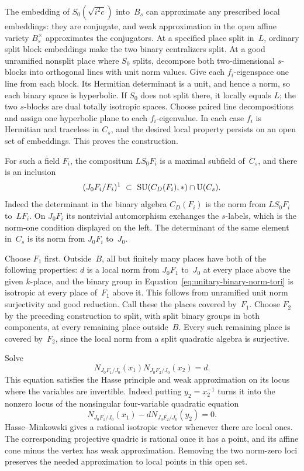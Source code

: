 The embedding of $S_0(\sqrt{i^2c})$ into~$B_s$ can approximate any
prescribed local embeddings: they are conjugate, and weak
approximation in the open affine variety $B_s^\times$ approximates
the conjugators.  At a specified place split in~$L$, ordinary split
block embeddings make the two binary centralizers split.  At a good
unramified nonsplit place where $S_0$ splits, decompose both
two-dimensional $s$-blocks into orthogonal lines with unit norm
values.  Give each $f_i$-eigenspace one line from each block.  Its
Hermitian determinant is a unit, and hence a norm, so each binary
space is hyperbolic.  If $S_0$ does not split there, it locally equals
$L$; the two $s$-blocks are dual totally isotropic spaces.  Choose
paired line decompositions and assign one hyperbolic plane to each
$f_i$-eigenvalue.  In each case $f_i$ is Hermitian and traceless in
$C_s$, and the desired local property persists on an open set of
embeddings.  This proves the construction.

For such a field $F_i$, the compositum $LS_0F_i$ is a maximal
subfield of~$C_s$, and there is an inclusion
\begin{equation}\label{eq:unitary-binary-norm-tori}
 (J_0F_i/F_i)^1
 \ \subset\ \operatorname{SU}(C_D(F_i),*)\cap\operatorname{U}(C_s).
\end{equation}
Indeed the determinant in the binary algebra $C_D(F_i)$ is the norm
from $LS_0F_i$ to~$LF_i$.  On $J_0F_i$ its nontrivial automorphism
exchanges the $s$-labels, which is the norm-one condition displayed
on the left.  The determinant of the same element in~$C_s$ is its
norm from $J_0F_i$ to~$J_0$.

Choose $F_1$ first.  Outside~$B$, all but finitely many places have
both of the following properties: $d$ is a local norm from
$J_0F_1$ to~$J_0$ at every place above the given $k$-place, and the
binary group in Equation~\eqref{eq:unitary-binary-norm-tori} is
isotropic at every place of~$F_1$ above it.  This follows from
unramified unit norm surjectivity and good reduction.  Call these
the places covered by~$F_1$.  Choose $F_2$ by the preceding
construction to split, with split binary groups in both components,
at every remaining place outside~$B$.  Every such remaining place
is covered by~$F_2$, since the local norm from a split quadratic
algebra is surjective.

Solve
\begin{equation}\label{eq:unitary-multinorm-correction}
 N_{J_0F_1/J_0}(x_1)N_{J_0F_2/J_0}(x_2)=d.
\end{equation}
This equation satisfies the Hasse principle and weak approximation
on its locus where the variables are invertible.  Indeed putting
$y_2=x_2^{-1}$ turns it into the nonzero locus of the nonsingular
four-variable quadratic equation
\[
 N_{J_0F_1/J_0}(x_1)-dN_{J_0F_2/J_0}(y_2)=0.
\]
Hasse--Minkowski \cite[Chapter~VIII, Theorem~3.5(b)]{MilneCFT}
gives a rational isotropic vector whenever there
are local ones.  The corresponding projective quadric is rational
once it has a point, and its affine cone minus the vertex has weak
approximation.  Removing the two norm-zero loci preserves the
needed approximation to local points in this open set.

